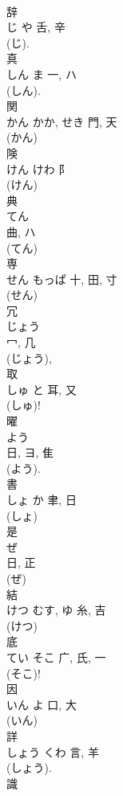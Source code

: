 \documentclass[8pt]{extreport}
\begin{document}
\begin{CJK}{UTF8}{min}
\\	辞	
\\	じ	や	舌, 辛	
\\	(じ). 
\\	真	
\\	しん	ま	一, ハ		
\\	(しん). 
\\	関	
\\	かん	かか, せき	門, 天		
\\	(かん) 
\\	険	
\\	けん	けわ	阝		
\\	(けん) 
\\	典	
\\	てん	
\\	曲, ハ	
\\	(てん) 
\\	専	
\\	せん	もっぱ	十, 田, 寸	
\\	(せん) 
\\	冗	
\\	じょう	
\\	冖, 几	
\\	(じょう), 
\\	取	
\\	しゅ	と	耳, 又	
\\	(しゅ)! 
\\	曜	
\\	よう	
\\	日, ヨ, 隹	
\\	(よう). 
\\	書	
\\	しょ	か	聿, 日	
\\	(しょ)
\\	是	
\\	ぜ	
\\	日, 正	
\\	(ぜ) 
\\	結	
\\	けつ	むす, ゆ	糸, 吉	
\\	(けつ) 
\\	底	
\\	てい	そこ	广, 氏, 一	
\\	(そこ)!	
\\	因	
\\	いん	よ	口, 大	
\\	(いん) 
\\	詳	
\\	しょう	くわ	言, 羊	
\\	(しょう). 
\\	識	

\end{CJK}
\end{document}
